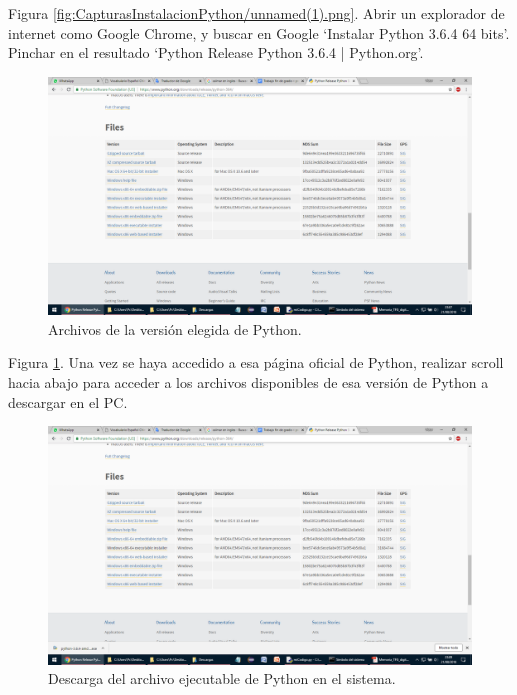 Figura \ref{fig:CapturasInstalacionPython/unnamed(1).png}. Abrir un explorador de internet como Google Chrome, y buscar en Google ‘Instalar Python 3.6.4 64 bits’. Pinchar en el resultado ‘Python Release Python 3.6.4 | Python.org’.

\begin{figure}[h!]
  	\centering
	\includegraphics[width=\textwidth]{CapturasInstalacionPython/unnamed(2).png}
	\caption{Archivos de la versión elegida de Python.
	\label{fig:CapturasInstalacionPython/unnamed(2).png}}
\end{figure}

Figura \ref{fig:CapturasInstalacionPython/unnamed(2).png}. Una vez se haya accedido a esa página oficial de Python, realizar scroll hacia abajo para acceder a los archivos disponibles de esa versión de Python a descargar en el PC.

\begin{figure}[h!]
  	\centering
	\includegraphics[width=\textwidth]{CapturasInstalacionPython/unnamed(3).png}
	\caption{Descarga del archivo ejecutable de Python en el sistema.
	\label{fig:CapturasInstalacionPython/unnamed(3).png}}
\end{figure}

